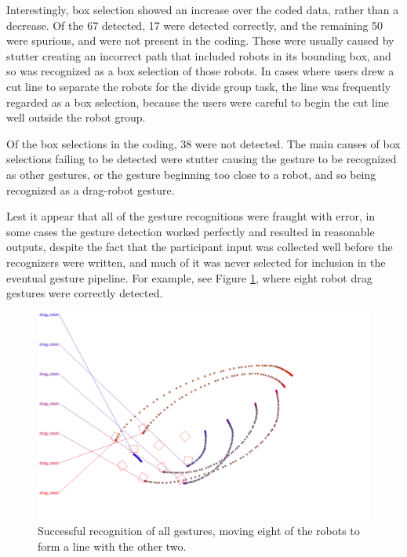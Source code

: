 Interestingly, box selection showed an increase over the coded data, rather than a decrease. 
Of the 67 detected, 17 were detected correctly, and the remaining 50 were spurious, and were not present in the coding.
These were usually caused by stutter creating an incorrect path that included robots in its bounding box, and so was recognized as a box selection of those robots. 
In cases where users drew a cut line to separate the robots for the divide group task, the line was frequently regarded as a box selection, because the users were careful to begin the cut line well outside the robot group.  

Of the box selections in the coding, 38 were not detected. 
The main causes of box selections failing to be detected were stutter causing the gesture to be recognized as other gestures, or the gesture beginning too close to a robot, and so being recognized as a drag-robot gesture. 

Lest it appear that all of the gesture recognitions were fraught with error, in some cases the gesture detection worked perfectly and resulted in reasonable outputs, despite the fact that the participant input was collected well before the recognizers were written, and much of it was never selected for inclusion in the eventual gesture pipeline. 
For example, see Figure \ref{recognizer_win}, where eight robot drag gestures were correctly detected.
 
 \begin{figure}
 	\centering
 	\includegraphics[width=\textwidth]{../../software/tool/test_pipeline/good_run/u8_c10_t10/u8_c10_t10_gestures.png}
 	\caption{Successful recognition of all gestures, moving eight of the robots to form a line with the other two. }
 	\label{recognizer_win}
 \end{figure}

